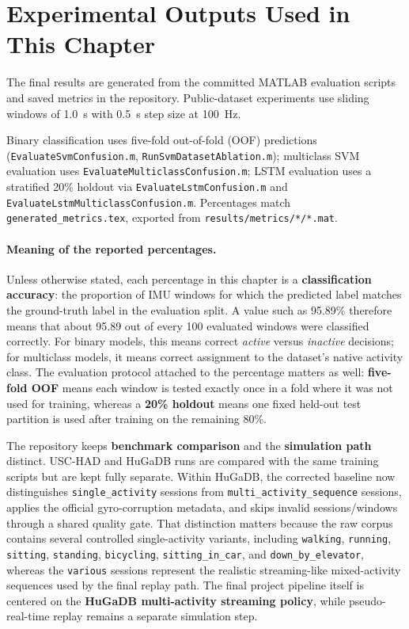 \section{Experimental Outputs Used in This Chapter}
The final results are generated from the committed MATLAB evaluation scripts and saved metrics in the repository. Public-dataset experiments use sliding windows of 1.0~s with 0.5~s step size at 100~Hz.

Binary classification uses five-fold out-of-fold (OOF) predictions (\texttt{EvaluateSvmConfusion.m}, \texttt{RunSvmDatasetAblation.m}); multiclass SVM evaluation uses \texttt{EvaluateMulticlassConfusion.m}; LSTM evaluation uses a stratified 20\% holdout via \texttt{EvaluateLstmConfusion.m} and \texttt{EvaluateLstmMulticlassConfusion.m}. Percentages match \texttt{generated\_metrics.tex}, exported from \texttt{results/metrics/*/*.mat}.

\paragraph{Meaning of the reported percentages.}
Unless otherwise stated, each percentage in this chapter is a \textbf{classification accuracy}: the proportion of IMU windows for which the predicted label matches the ground-truth label in the evaluation split. A value such as 95.89\% therefore means that about 95.89 out of every 100 evaluated windows were classified correctly. For binary models, this means correct \emph{active} versus \emph{inactive} decisions; for multiclass models, it means correct assignment to the dataset's native activity class. The evaluation protocol attached to the percentage matters as well: \textbf{five-fold OOF} means each window is tested exactly once in a fold where it was not used for training, whereas a \textbf{20\% holdout} means one fixed held-out test partition is used after training on the remaining 80\%.

The repository keeps \textbf{benchmark comparison} and the \textbf{simulation path} distinct. USC-HAD and HuGaDB runs are compared with the same training scripts but are kept fully separate. Within HuGaDB, the corrected baseline now distinguishes \texttt{single\_activity} sessions from \texttt{multi\_activity\_sequence} sessions, applies the official gyro-corruption metadata, and skips invalid sessions/windows through a shared quality gate. That distinction matters because the raw corpus contains several controlled single-activity variants, including \texttt{walking}, \texttt{running}, \texttt{sitting}, \texttt{standing}, \texttt{bicycling}, \texttt{sitting\_in\_car}, and \texttt{down\_by\_elevator}, whereas the \texttt{various} sessions represent the realistic streaming-like mixed-activity sequences used by the final replay path. The final project pipeline itself is centered on the \textbf{HuGaDB multi-activity streaming policy}, while pseudo-real-time replay remains a separate simulation step.

